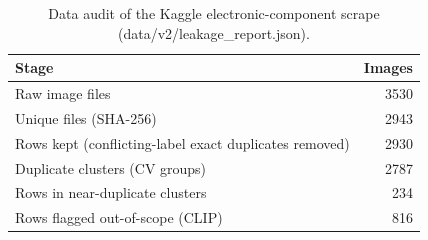 \begin{table}[t]
\centering\small
\caption{Data audit of the Kaggle electronic-component scrape (data/v2/leakage\_report.json).}
\label{tab:data_audit}
\begin{tabular}{lr}
\toprule
Stage & Images \\
\midrule
Raw image files & 3530 \\
Unique files (SHA-256) & 2943 \\
Rows kept (conflicting-label exact duplicates removed) & 2930 \\
Duplicate clusters (CV groups) & 2787 \\
Rows in near-duplicate clusters & 234 \\
Rows flagged out-of-scope (CLIP) & 816 \\
\bottomrule
\end{tabular}
\end{table}
